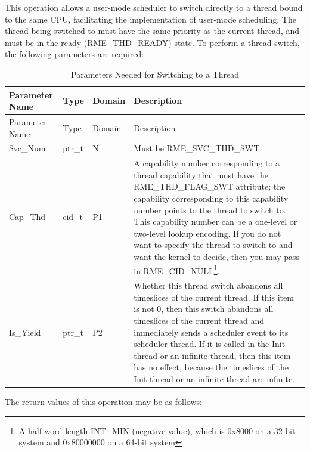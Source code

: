 This operation allows a user-mode scheduler to switch directly to a thread bound to the same CPU, facilitating the implementation of user-mode scheduling. The thread being switched to must have the same priority as the current thread, and must be in the ready (RME\_THD\_READY) state. To perform a thread switch, the following parameters are required:

\begin{xltabular}{\textwidth}{@{}>{\hsize\raggedright\arraybackslash}X>{\hsize\raggedright\arraybackslash}X>{\hsize\raggedright\arraybackslash}X>{\hsize\raggedright\arraybackslash}X@{}}
\caption{Parameters Needed for Switching to a Thread}\label{tab:4-36-switch-to-thread-parameters}\\
\toprule
Parameter Name & Type & Domain & Description\tabularnewline
\endfirsthead
\toprule
Parameter Name & Type & Domain & Description\tabularnewline
\midrule
\endhead
\bottomrule
\endlastfoot
Svc\_Num & ptr\_t & N & Must be RME\_SVC\_THD\_SWT.\tabularnewline
Cap\_Thd & cid\_t & P1 &
A capability number corresponding to a thread capability that must have the RME\_THD\_FLAG\_SWT attribute; the capability corresponding to this capability number points to the thread to switch to. This capability number can be a one-level or two-level lookup encoding. If you do not want to specify the thread to switch to and want the kernel to decide, then you may pass in RME\_CID\_NULL\footnote{A half-word-length INT\_MIN (negative value), which is 0x8000 on a 32-bit system and 0x80000000 on a 64-bit system}.\tabularnewline
Is\_Yield & ptr\_t & P2 &
Whether this thread switch abandons all timeslices of the current thread. If this item is not 0, then this switch abandons all timeslices of the current thread and immediately sends a scheduler event to its scheduler thread. If it is called in the Init thread or an infinite thread, then this item has no effect, because the timeslices of the Init thread or an infinite thread are infinite.\tabularnewline
\end{xltabular}
\nopagebreak[4]

The return values of this operation may be as follows:

